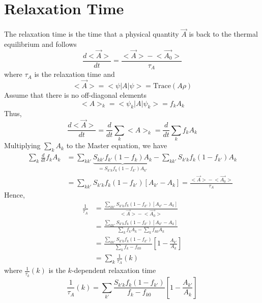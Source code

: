 \section{Relaxation Time}
The relaxation time is the time that a physical quantity $\vec{A}$ is back to the thermal equilibrium and follows \begin{equation}
    \frac{d\big<\vec{A}\big>}{dt} = \frac{\big<\vec{A}\big>-\big<\vec{A_{0}}\big>}{\tau_{A}}
\end{equation} where $\tau_{A}$ is the relaxation time and \begin{equation}
    \big<\vec{A}\big> = \big<\psi\big|A\big|\psi\big> = \text{Trace}(A\rho)
\end{equation} Assume that there is no off-diagonal elements \begin{equation}
    \big<A\big>_{k} = \big<\psi_{k}\big|A\big|\psi_{k}\big> = f_{k}A_{k}
\end{equation} Thus, \begin{equation}
    \frac{d\big<\vec{A}\big>}{dt} = \frac{d}{dt}\sum_{k}{\big<A\big>_{k}} = \frac{d}{dt}\sum_{k}{f_{k}A_{k}}
\end{equation} Multiplying $\sum_{k}{A_{k}}$ to the Master equation, we have \begin{align}
    \sum_{k}{\frac{d}{dt}f_{k}A_{k}}& = \sum_{kk'}{\underbrace{S_{kk'}f_{k'}(1-f_{k})A_{k}}_{=S_{k'k}f_{k}(1-f_{k'})A_{k'}}} - \sum_{kk'}{S_{k'k}f_{k}(1-f_{k'})A_{k}}\nonumber\\
    & = \sum_{kk'}{S_{k'k}f_{k}(1-f_{k'})[A_{k'}-A_{k}]} = \frac{\big<\vec{A}\big>-\big<\vec{A_{0}}\big>}{\tau_{A}}
\end{align} Hence, \begin{align}
    \frac{1}{\tau_{A}}& = \frac{\sum_{kk'}{S_{k'k}f_{k}(1-f_{k'})[A_{k'}-A_{k}]}}{\big<\vec{A}\big>-\big<\vec{A_{0}}\big>}\nonumber\\
    & = \frac{\sum_{kk'}{S_{k'k}f_{k}(1-f_{k'})[A_{k'}-A_{k}]}}{\sum_{k}{f_{k}A_{k}}-\sum_{k}{f_{k0}A_{k}}}\nonumber\\
    & = \frac{\sum_{kk'}{S_{k'k}f_{k}(1-f_{k'})}}{\sum_{k}{f_{k}-f_{k0}}}\left[1-\frac{A_{k'}}{A_{k}}\right]\nonumber\\
    & = \sum_{k}{\frac{1}{\tau_{A}}(k)}
\end{align} where $\frac{1}{\tau_{k}}(k)$ is the $k$-dependent relaxation time \begin{equation}
    \boxed{\frac{1}{\tau_{A}}(k) = \sum_{k'}{\frac{S_{k'k}f_{k}(1-f_{k'})}{f_{k}-f_{k0}}\left[1-\frac{A_{k'}}{A_{k}}\right]}}
\end{equation}
